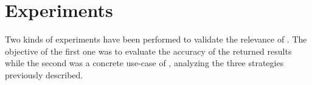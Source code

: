 
\section{Experiments}
\label{sec:experiments}

Two kinds of experiments have been performed to validate the relevance
of \vmps. The objective of the first one was to evaluate the accuracy of the
returned results while the second was a concrete use-case of
\vmps, analyzing the three strategies previously described.




%

